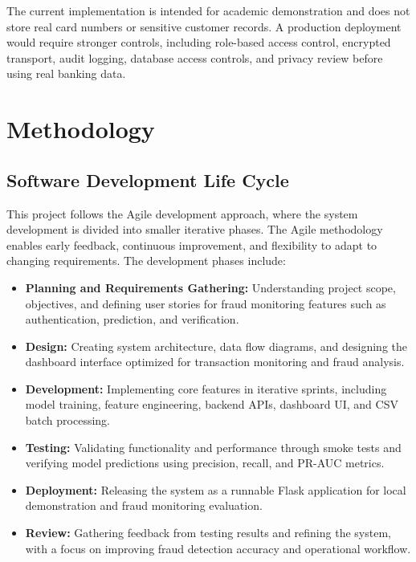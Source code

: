 \documentclass[12pt,a4paper]{report}
\begin{document}
The current implementation is intended for academic demonstration and does not store real card numbers or sensitive customer records. A production deployment would require stronger controls, including role-based access control, encrypted transport, audit logging, database access controls, and privacy review before using real banking data.

\chapter{Methodology}

\section{Software Development Life Cycle}
This project follows the Agile development approach, where the system development is divided into smaller iterative phases. The Agile methodology enables early feedback, continuous improvement, and flexibility to adapt to changing requirements. The development phases include:

\begin{itemize}
    \item \textbf{Planning and Requirements Gathering:} Understanding project scope, objectives, and defining user stories for fraud monitoring features such as authentication, prediction, and verification.
    \item \textbf{Design:} Creating system architecture, data flow diagrams, and designing the dashboard interface optimized for transaction monitoring and fraud analysis.
    \item \textbf{Development:} Implementing core features in iterative sprints, including model training, feature engineering, backend APIs, dashboard UI, and CSV batch processing.
    \item \textbf{Testing:} Validating functionality and performance through smoke tests and verifying model predictions using precision, recall, and PR-AUC metrics.
    \item \textbf{Deployment:} Releasing the system as a runnable Flask application for local demonstration and fraud monitoring evaluation.
    \item \textbf{Review:} Gathering feedback from testing results and refining the system, with a focus on improving fraud detection accuracy and operational workflow.
\end{itemize}
\end{document}
